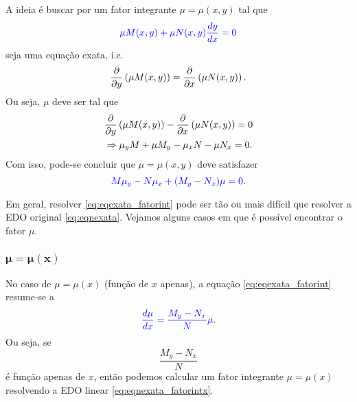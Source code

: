 A ideia é buscar por um fator integrante $\mu = \mu(x,y)$ tal que
\begin{equation}
  {\color{blue}\mu M(x,y) + \mu N(x,y)\frac{dy}{dx} = 0}
\end{equation}
seja uma equação exata, i.e.
\begin{equation}
  \frac{\partial}{\partial y}\left(\mu M(x,y)\right) = \frac{\partial}{\partial x}\left(\mu N(x,y)\right).
\end{equation}
Ou seja, $\mu$ deve ser tal que
\begin{align}
  &\frac{\partial}{\partial y}\left(\mu M(x,y)\right) - \frac{\partial}{\partial x}\left(\mu N(x,y)\right) = 0 \\
  &\Rightarrow \mu_y M + \mu M_y - \mu_x N - \mu N_x = 0.
\end{align}
Com isso, pode-se concluir que $\mu = \mu(x,y)$ deve satisfazer
\begin{equation}\label{eq:eqexata_fatorint}
  {\color{blue}M\mu_y - N\mu_x + (M_y - N_x)\mu = 0}.
\end{equation}

Em geral, resolver \eqref{eq:eqexata_fatorint} pode ser tão ou mais difícil que resolver a EDO original \eqref{eq:eqnexata}. Vejamos alguns casos em que é possível encontrar o fator $\mu$.

\subsubsection{$\pmb{\mu = \mu(x)}$}

No caso de $\mu = \mu(x)$ (função de $x$ apenas), a equação \eqref{eq:eqexata_fatorint} resume-se a
\begin{equation}\label{eq:eqnexata_fatorintx}
  {\color{blue}\frac{d\mu}{dx} = \frac{M_y-N_x}{N}\mu}.
\end{equation}
Ou seja, se
\begin{equation}
  \frac{M_y-N_x}{N}
\end{equation}
é função apenas de $x$, então podemos calcular um fator integrante $\mu = \mu(x)$ resolvendo a EDO linear \eqref{eq:eqnexata_fatorintx}.

